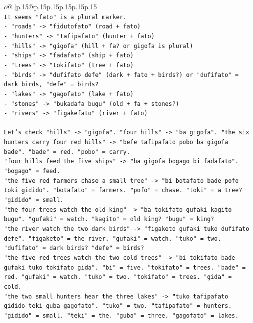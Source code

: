 \documentclass{article}
\begin{document}
{\begin{supertabular}{c@{$\;$}|p{.15\linewidth}@{}p{.15\linewidth}p{.15\linewidth}p{.15\linewidth}p{.15\linewidth}p{.15\linewidth}}
{{{\\ 
\texttt{It seems "fato" is a plural marker.} \\
\texttt{{-} "roads" {-}> "fidutofato" (road + fato)} \\
\texttt{{-} "hunters" {-}> "tafipafato" (hunter + fato)} \\
\texttt{{-} "hills" {-}> "gigofa" (hill + fa? or gigofa is plural)} \\
\texttt{{-} "ships" {-}> "fadafato" (ship + fato)} \\
\texttt{{-} "trees" {-}> "tokifato" (tree + fato)} \\
\texttt{{-} "birds" {-}> "dufifato defe" (dark + fato + birds?) or "dufifato" = dark birds, "defe" = birds?} \\
\texttt{{-} "lakes" {-}> "gagofato" (lake + fato)} \\
\texttt{{-} "stones" {-}> "bukadafa bugu" (old + fa + stones?)} \\
\texttt{{-} "rivers" {-}> "figakefato" (river + fato)} \\
\\ 
\texttt{Let's check "hills" {-}> "gigofa". "four hills" {-}> "ba gigofa". "the six hunters carry four red hills" {-}> "befe tafipafato pobo ba gigofa bade". "bade" = red. "pobo" = carry.} \\
\texttt{"four hills feed the five ships" {-}> "ba gigofa bogago bi fadafato". "bogago" = feed.} \\
\texttt{"the five red farmers chase a small tree" {-}> "bi botafato bade pofo toki gidido". "botafato" = farmers. "pofo" = chase. "toki" = a tree? "gidido" = small.} \\
\texttt{"the four trees watch the old king" {-}> "ba tokifato gufaki kagito bugu". "gufaki" = watch. "kagito" = old king? "bugu" = king?} \\
\texttt{"the river watch the two dark birds" {-}> "figaketo gufaki tuko dufifato defe". "figaketo" = the river. "gufaki" = watch. "tuko" = two. "dufifato" = dark birds? "defe" = birds?} \\
\texttt{"the five red trees watch the two cold trees" {-}> "bi tokifato bade gufaki tuko tokifato gida". "bi" = five. "tokifato" = trees. "bade" = red. "gufaki" = watch. "tuko" = two. "tokifato" = trees. "gida" = cold.} \\
\texttt{"the two small hunters hear the three lakes" {-}> "tuko tafipafato gidido teki guba gagofato". "tuko" = two. "tafipafato" = hunters. "gidido" = small. "teki" = the. "guba" = three. "gagofato" = lakes.} \\
}}}
\end{supertabular}}
\end{document}
